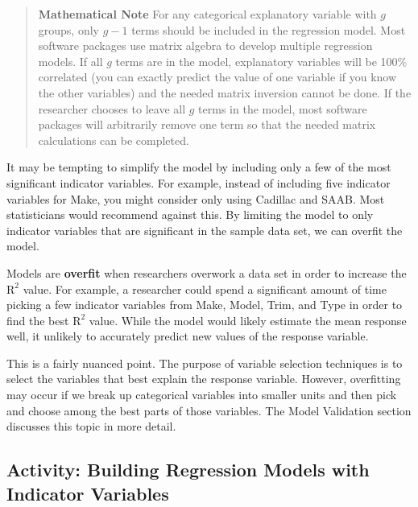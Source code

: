 \documentclass[
]{book}
\begin{document}
\begin{quote}
\textbf{Mathematical Note}
For any categorical explanatory variable with \(g\) groups, only \(g - 1\) terms should be included in the regression model. Most software packages use matrix algebra to develop multiple regression models. If all \(g\) terms are in the model, explanatory variables will be 100\% correlated (you can exactly predict the value of one variable if you know the other variables) and the needed matrix inversion cannot be done. If the researcher chooses to leave all \(g\) terms in the model, most software packages will arbitrarily remove one term so that the needed matrix calculations can be completed.
\end{quote}

It may be tempting to simplify the model by including only a few of the most significant indicator variables. For example, instead of including five indicator variables for Make, you might consider only using Cadillac and SAAB. Most statisticians would recommend against this. By limiting the model to only indicator variables that are significant in the sample data set, we can overfit the model.

Models are \textbf{overfit} when researchers overwork a data set in order to increase the \(\mathrm{R}^2\) value. For example, a researcher could spend a significant amount of time picking a few indicator variables from Make, Model, Trim, and Type in order to find the best \(\mathrm{R}^2\) value. While the model would likely estimate the mean response well, it unlikely to accurately predict new values of the response variable.

This is a fairly nuanced point. The purpose of variable selection techniques is to select the variables that best explain the response variable. However, overfitting may occur if we break up categorical variables into smaller units and then pick and choose among the best parts of those variables. The Model Validation section
discusses this topic in more detail.

\hypertarget{activity-building-regression-models-with-indicator-variables}{%
\subsection*{Activity: Building Regression Models with Indicator Variables}\label{activity-building-regression-models-with-indicator-variables}}
\end{document}
